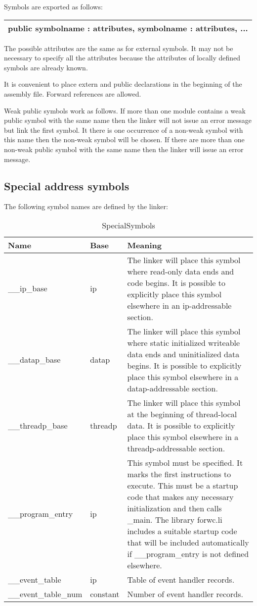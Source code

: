 \documentclass[forwardcom.tex]{subfiles}
\begin{document}
Symbols are exported as follows:
\vv

\begin{tabular}{|p{150mm}|}
\hline
\hspace{4mm} public symbolname : attributes, symbolname : attributes, ...\\
\hline
\end{tabular}
\vv

The possible attributes are the same as for external symbols. It may not be necessary to specify all the attributes because the attributes of locally defined symbols are already known. 
\vv

It is convenient to place extern and public declarations in the beginning of the assembly file. Forward references are allowed.
\vv

Weak public symbols work as follows. If more than one module contains a weak public symbol with the same name then the linker will not issue an error message but link the first symbol.
It there is one occurrence of a non-weak symbol with this name then the non-weak symbol will be chosen. If there are more than one non-weak public symbol with the same name then the linker will issue an error message.
\vv

\subsection{Special address symbols} \label{SpecialAddressSymbols}
The following symbol names are defined by the linker:

\begin{longtable} {|p{35mm}|p{16mm}|p{85mm}|}
\caption{SpecialSymbols} 
\label{table:specialSymbols}\\
\endfirsthead
\endhead
\hline
\bfseries Name & \bfseries Base & \bfseries Meaning  \\
\hline
\_\_ip\_base & ip & The linker will place this symbol where read-only data ends and code begins. 
It is possible to explicitly place this symbol elsewhere in an ip-addressable section.\\
\hline
\_\_datap\_base & datap & The linker will place this symbol where static initialized writeable data ends and uninitialized data begins. 
It is possible to explicitly place this symbol elsewhere in a datap-addressable section.\\
\hline
\_\_threadp\_base & threadp & The linker will place this symbol at the beginning of thread-local data. 
It is possible to explicitly place this symbol elsewhere in a threadp-addressable section.\\
\hline
\_\_program\_entry & ip & This symbol must be specified. It marks the first instructions to execute. 
This must be a startup code that makes any necessary initialization and then calls \_main.
The library forwc.li includes a suitable startup code that will be included automatically
if \_\_program\_entry is not defined elsewhere.\\
\hline
\_\_event\_table & ip & Table of event handler records.\\
\hline
\_\_event\_table\_num & constant & Number of event handler records.\\
\hline
\end{longtable}
\end{document}
